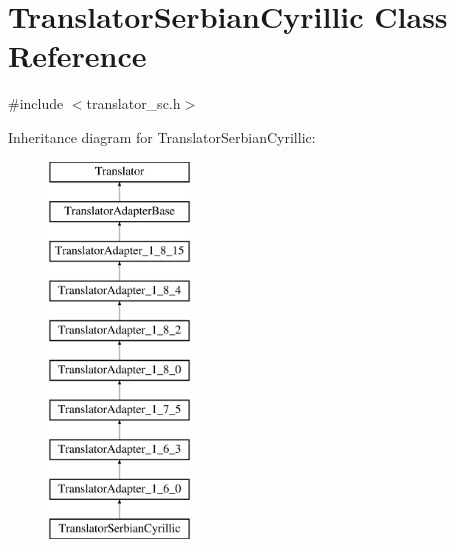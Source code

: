 \hypertarget{class_translator_serbian_cyrillic}{}\section{Translator\+Serbian\+Cyrillic Class Reference}
\label{class_translator_serbian_cyrillic}


{\ttfamily \#include $<$translator\+\_\+sc.\+h$>$}

Inheritance diagram for Translator\+Serbian\+Cyrillic\+:\begin{figure}[H]
\begin{center}
\leavevmode
\includegraphics[height=10.000000cm]{class_translator_serbian_cyrillic}
\end{center}
\end{figure}
